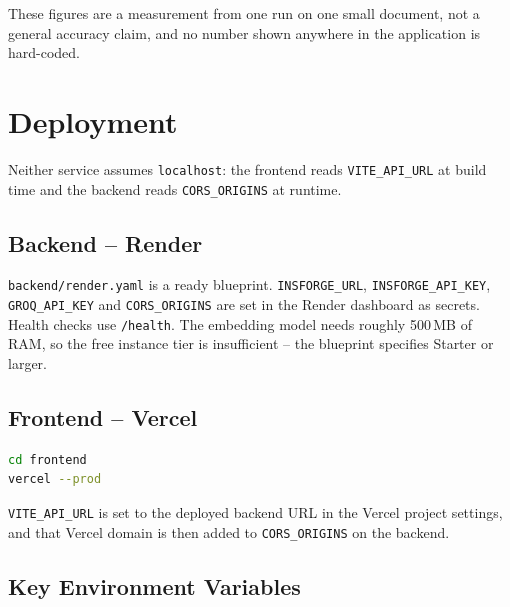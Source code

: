 \documentclass[11pt,a4paper]{article}
\begin{document}
These figures are a measurement from one run on one small document, not a
general accuracy claim, and no number shown anywhere in the application is
hard-coded.

\section{Deployment}

Neither service assumes \texttt{localhost}: the frontend reads
\texttt{VITE\_API\_URL} at build time and the backend reads
\texttt{CORS\_ORIGINS} at runtime.

\subsection{Backend -- Render}

\texttt{backend/render.yaml} is a ready blueprint. \texttt{INSFORGE\_URL},
\texttt{INSFORGE\_API\_KEY}, \texttt{GROQ\_API\_KEY} and
\texttt{CORS\_ORIGINS} are set in the Render dashboard as secrets. Health
checks use \texttt{/health}. The embedding model needs roughly 500\,MB of
RAM, so the free instance tier is insufficient -- the blueprint specifies
Starter or larger.

\subsection{Frontend -- Vercel}

\begin{lstlisting}[language=bash]
cd frontend
vercel --prod
\end{lstlisting}

\texttt{VITE\_API\_URL} is set to the deployed backend URL in the Vercel
project settings, and that Vercel domain is then added to
\texttt{CORS\_ORIGINS} on the backend.

\subsection{Key Environment Variables}
\end{document}
